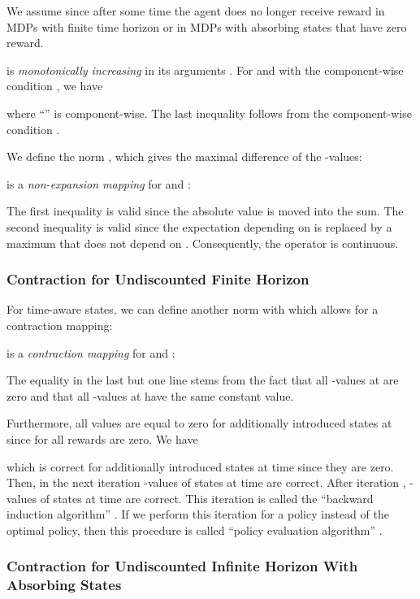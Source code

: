 \documentclass{article}
\begin{document}
\begin{appendices}
We assume  since after some time the agent does no longer
receive reward in MDPs with finite time horizon or in MDPs with
absorbing states that have zero reward.


 is {\em monotonically increasing} in its arguments \cite{Bertsekas:96}.
For  and  with the component-wise condition , we have

where ``'' is component-wise. The last inequality follows from
the component-wise condition .

We define the norm , which gives the maximal difference of
the -values:


 is a {\em non-expansion mapping} for  and :
 

The first inequality is valid since
the absolute value is moved into the sum.
The second inequality is valid since
the expectation depending on  is replaced by a maximum that
does not depend on .
Consequently, the operator  is continuous.



\subsubsection{Contraction for Undiscounted Finite Horizon}
\label{sec:ApropPolyCon}

For time-aware states, we can define another norm with
 which
allows for a contraction mapping:



 is a {\em contraction mapping} for  and  \cite{Bertsekas:96}:
 
The equality in the last but one line stems from the fact that
all -values at  are zero and that all -values at  have
the same constant value. 


Furthermore, all  values are equal to
zero for additionally introduced
states at  since for  all rewards are zero.
We have
 
which is correct for additionally introduced states at time  since they are zero.
Then, in the next iteration -values of states at time  are correct.
After iteration , -values of states at time  are correct.
This iteration is called the ``backward induction algorithm'' \cite{Puterman:90,Puterman:05}.
If we perform this iteration for a policy  instead of
the optimal policy, then this procedure is called ``policy evaluation
algorithm'' \cite{Puterman:90,Puterman:05}.





\subsubsection{Contraction for Undiscounted Infinite Horizon With Absorbing States}
\label{sec:ApropPolyCon2}


\end{appendices}
\end{document}
